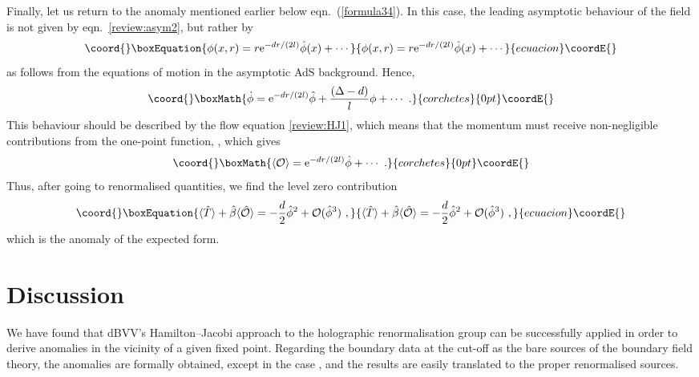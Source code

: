 \documentclass[a4paper,12pt]{article}
\begin{document}
Finally, let us return to the \coordHE{} anomaly mentioned earlier below 
eqn.\ (\ref{formula34}). In
this case, the leading asymptotic behaviour of the field \myHighlight{$\phi$}\coordHE{} is not
given by eqn.\ \eqref{review:asym2}, but rather by 
\begin{equation}\coord{}\boxEquation{
\label{perturb:Deltad2}
  \phi(x,r) = r \e{-dr/(2l)} \hat{\phi} (x) +\cdots
}{
\phi(x,r) = r \e{-dr/(2l)} \hat{\phi} (x) +\cdots
}{ecuacion}\coordE{}\end{equation}
as follows from the equations of motion in the asymptotic AdS background.
Hence, 
\[\coord{}\boxMath{ \dot{\phi} = \e{-dr/(2l)} \hat{\phi} + \frac{(\Delta-d)}{l} \phi +\cdots~. }{corchetes}{0pt}\coordE{}\]
This behaviour should be described by the flow equation
\eqref{review:HJ1}, which means that the momentum \coordHE{} must receive 
non-negligible contributions from
the one-point function, \coordHE{}, which gives 
\[\coord{}\boxMath{ \langle \mathcal{O} \rangle = \e{-dr/(2l)} \hat{\phi} +\cdots~.}{corchetes}{0pt}\coordE{}\]
Thus, after going to renormalised quantities, we find the level zero
contribution 
\begin{equation}\coord{}\boxEquation{
\label{perturb:Deltad2anom}
  \langle \hat{T}\rangle+\hat{\beta} \langle \hat{\mathcal{O}} 
  \rangle = -\frac{d}2
  \hat{\phi}^2 +\mathcal{O}(\hat{\phi}^3)~,
}{
\langle \hat{T}\rangle+\hat{\beta} \langle \hat{\mathcal{O}} 
  \rangle = -\frac{d}2
  \hat{\phi}^2 +\mathcal{O}(\hat{\phi}^3)~,
}{ecuacion}\coordE{}\end{equation}
which is the anomaly of the expected form.







\section{Discussion}
\label{global}
We have found that dBVV's Hamilton--Jacobi approach to
the holographic renormalisation group can be successfully applied in
order to derive anomalies in the vicinity of a
given fixed point. Regarding the boundary data at the cut-off as the
bare sources 
of the boundary field theory, the anomalies are formally obtained,
except in the case \coordHE{}, and the results are easily
translated to the proper renormalised sources. 
\end{document}
